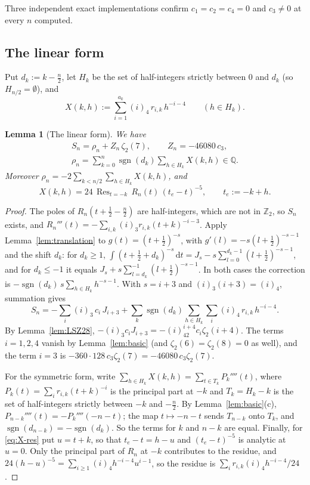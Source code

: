 \documentclass{amsart}
\newtheorem{lemma}[theorem]{Lemma}
\theoremstyle{definition}
\theoremstyle{remark}
\numberwithin{equation}{section}
\newcommand{\Z}{\mathbb{Z}}
\newcommand{\Q}{\mathbb{Q}}
\newcommand{\sgn}{\operatorname{sgn}}
\newcommand{\Res}{\operatorname{Res}}
\newcommand{\dd}{\,\mathrm{d}}
\begin{document}
Three independent exact implementations confirm $c_1=c_2=c_4=0$ and $c_3\ne0$
at every $n$ computed.

\subsection{The linear form}\label{ss:linear}

Put $d_k:=k-\frac n2$, let $H_k$ be the set of half-integers strictly between
$0$ and $d_k$ (so $H_{n/2}=\emptyset$), and
\begin{equation}\label{eq:X}
  X(k,h):=\sum_{i=1}^{a_k}(i)_4\,r_{i,k}\,h^{-i-4}\qquad(h\in H_k).
\end{equation}

\begin{lemma}[The linear form]\label{lem:L}
We have
\begin{equation}\label{eq:L}
  \begin{gathered}
  S_n=\rho_n+Z_n\,\zeta_2(7),\qquad Z_n=-46080\,c_3,\\
  \rho_n=\sum_{k=0}^{n}\sgn(d_k)\sum_{h\in H_k}X(k,h)\in\Q .
  \end{gathered}
\end{equation}
Moreover $\rho_n=-2\sum_{k<n/2}\sum_{h\in H_k}X(k,h)$, and
\begin{equation}\label{eq:X-res}
  X(k,h)=24\,\Res_{t=-k}\,R_n(t)\,(t_e-t)^{-5},\qquad t_e:=-k+h .
\end{equation}
\end{lemma}

\begin{proof}
The poles of $R_n(t+\frac12-\frac n2)$ are half-integers, which are not in
$\Z_2$, so $S_n$ exists, and
$R_n'''(t)=-\sum_{i,k}(i)_3r_{i,k}(t+k)^{-i-3}$. Apply
Lemma~\ref{lem:translation} to $g(t)=(t+\frac12)^{-s}$, with
$g'(l)=-s(l+\frac12)^{-s-1}$ and the shift $d_k$: for $d_k\ge1$,
$\int(t+\frac12+d_k)^{-s}\dd t=J_s-s\sum_{l=0}^{d_k-1}(l+\frac12)^{-s-1}$, and
for $d_k\le-1$ it equals $J_s+s\sum_{l=d_k}^{-1}(l+\frac12)^{-s-1}$. In both
cases the correction is $-\sgn(d_k)\,s\sum_{h\in H_k}h^{-s-1}$. With
$s=i+3$ and $(i)_3(i+3)=(i)_4$, summation gives
\[
  S_n=-\sum_i(i)_3\,c_i\,J_{i+3}+\sum_k\sgn(d_k)\sum_{h\in H_k}\sum_i(i)_4\,r_{i,k}\,h^{-i-4}.
\]
By Lemma~\ref{lem:LSZ28}, $-(i)_3c_iJ_{i+3}=-(i)_42^{i+4}c_i\zeta_2(i+4)$.
The terms $i=1,2,4$ vanish by Lemma~\ref{lem:basic} (and
$\zeta_2(6)=\zeta_2(8)=0$ as well), and the term $i=3$ is
$-360\cdot128\,c_3\zeta_2(7)=-46080\,c_3\zeta_2(7)$.

For the symmetric form, write $\sum_{h\in H_k}X(k,h)=\sum_{t\in T_k}P_k''''(t)$,
where $P_k(t)=\sum_ir_{i,k}(t+k)^{-i}$ is the principal part at $-k$ and
$T_k=H_k-k$ is the set of half-integers strictly between $-k$ and $-\frac n2$.
By Lemma~\ref{lem:basic}(c), $P_{n-k}''''(t)=-P_k''''(-n-t)$; the map
$t\mapsto-n-t$ sends $T_{n-k}$ onto $T_k$, and $\sgn(d_{n-k})=-\sgn(d_k)$. So
the terms for $k$ and $n-k$ are equal. Finally, for \eqref{eq:X-res} put
$u=t+k$, so that $t_e-t=h-u$ and $(t_e-t)^{-5}$ is analytic at $u=0$. Only the
principal part of $R_n$ at $-k$ contributes to the residue, and
$24(h-u)^{-5}=\sum_{i\ge1}(i)_4h^{-i-4}u^{i-1}$, so the residue is
$\sum_ir_{i,k}(i)_4h^{-i-4}/24$.
\end{proof}
\end{document}

